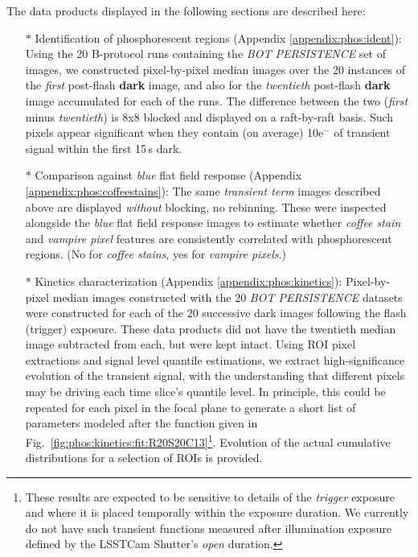 The data products displayed in the following sections are described here:
\begin{itemize}
    \item[$\ast$] Identification of phosphorescent regions (Appendix \ref{appendix:phos:ident}): Using the 20 B-protocol runs containing the {\it BOT PERSISTENCE} set of images, we constructed pixel-by-pixel median images over the 20 instances of the {\it first} post-flash {\bf dark} image, and also for the {\it twentieth} post-flash {\bf dark} image accumulated for each of the runs. The difference between the two ({\it first} minus {\it twentieth}) is 8x8 blocked and displayed on a raft-by-raft basis. Such pixels appear significant when they contain (on average) 10e$^-$ of transient signal within the first 15\,s dark.
    \item[$\ast$] Comparison against {\it blue} flat field response (Appendix \ref{appendix:phos:coffeestains}): The same {\it transient term} images described above are displayed {\it without} blocking, no rebinning. These were inspected alongside the {\it blue} flat field response images to estimate whether {\it coffee stain} and {\it vampire pixel} features are consistently correlated with phosphorescent regions. (No for {\it coffee stains}, yes for {\it vampire pixels}.)
    \item[$\ast$] Kinetics characterization (Appendix \ref{appendix:phos:kinetics}): Pixel-by-pixel median images constructed with the 20 {\it BOT PERSISTENCE} datasets were constructed for each of the 20 successive dark images following the flash (trigger) exposure. These data products did not have the twentieth median image subtracted from each, but were kept intact. Using ROI pixel extractions and signal level quantile estimations, we extract high-significance evolution of the transient signal, with the understanding that different pixels may be driving each time slice's quantile level. In principle, this could be repeated for each pixel in the focal plane to generate a short list of parameters modeled after the function given in Fig.~\ref{fig:phos:kinetics:fit:R20S20C13}\footnote{These results are expected to be sensitive to details of the {\it trigger} exposure and where it is placed temporally within the exposure duration. We currently do not have such transient functions measured after illumination exposure defined by the LSSTCam Shutter's {\it open} duration.}. Evolution of the actual cumulative distributions for a selection of ROIs is provided.

\end{itemize}
